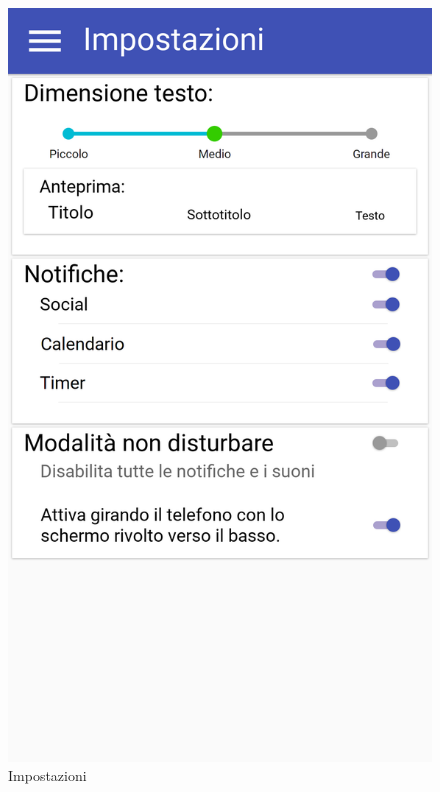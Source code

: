 \begin{figure}[H]
\begin{minipage}{.49\textwidth}
		\includegraphics[width=\textwidth]{img/wireframe/impostazioni_non_disturbare_non_attiva.png}
		\caption{Impostazioni}
	\end{minipage}
\end{figure}
